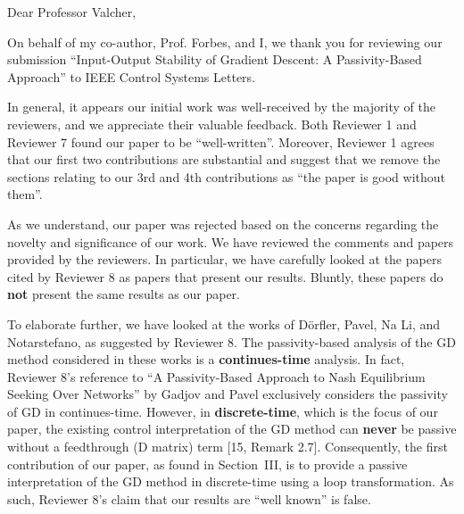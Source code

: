 \thispagestyle{empty}
\setcounter{page}{0}
\begin{flushleft}
    Dear Professor Valcher,

    On behalf of my co-author, Prof. Forbes, and I, we thank you for reviewing our submission ``Input-Output Stability of Gradient Descent: A Passivity-Based Approach'' to IEEE Control Systems Letters.

    In general, it appears our initial work was well-received by the majority of the reviewers, and we appreciate their valuable feedback. Both Reviewer 1 and Reviewer 7 found our paper to be ``well-written''. Moreover, Reviewer 1 agrees that our first two contributions are substantial and suggest that we remove the sections relating to our 3rd and 4th contributions as ``the paper is good without them''.
    
    As we understand, our paper was rejected based on the concerns regarding the novelty and significance of our work. We have reviewed the comments and papers provided by the reviewers. In particular, we have carefully looked at the papers cited by Reviewer 8 as papers that present our results. Bluntly, these papers do \textbf{not} present the same results as our paper.

    To elaborate further, we have looked at the works of Dörfler, Pavel, Na Li, and Notarstefano, as suggested by Reviewer 8. The passivity-based analysis of the GD method considered in these works is a \textbf{continues-time} analysis. In fact, Reviewer 8's reference to ``A Passivity-Based Approach to Nash Equilibrium Seeking Over Networks'' by Gadjov and Pavel exclusively considers the passivity of GD in continues-time. However, in \textbf{discrete-time}, which is the focus of our paper, the existing control interpretation of the GD method can \textbf{never} be passive without a feedthrough (D matrix) term [15, Remark 2.7]. Consequently, the first contribution of our paper, as found in Section~III, is to provide a passive interpretation of the GD method in discrete-time using a loop transformation. As such, Reviewer 8's claim that our results are ``well known'' is false.


\end{flushleft}

